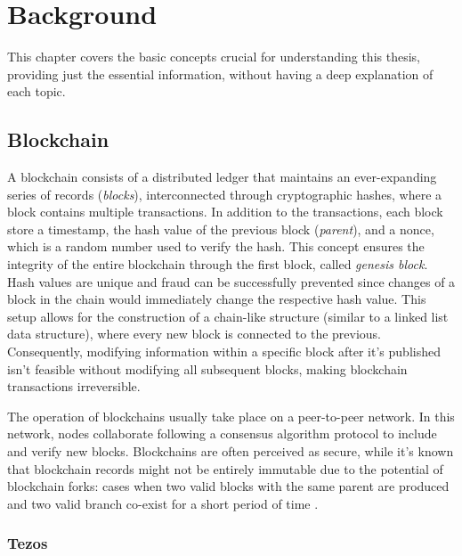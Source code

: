 \chapter{Background}

This chapter covers the basic concepts crucial for understanding this thesis, providing just the essential information, without having a deep explanation of each topic.

\section{Blockchain}

A blockchain consists of a distributed ledger that maintains an ever-expanding series of records (\textit{blocks}), interconnected through cryptographic hashes, where a block contains multiple transactions. In addition to the transactions, each block store a timestamp, the hash value of the previous block (\textit{parent}), and a nonce, which is a random number used to verify the hash. This concept ensures the integrity of the entire blockchain through the first block, called \textit{genesis block}. Hash values are unique and fraud can be successfully prevented since changes of a block in the chain would immediately change the respective hash value. This setup allows for the construction of a chain-like structure (similar to a linked list data structure), where every new block is connected to the previous. Consequently, modifying information within a specific block after it's published isn't feasible without modifying all subsequent blocks, making blockchain transactions irreversible. \cite{nofer_blockchain_2017}

The operation of blockchains usually take place on a peer-to-peer network. In this network, nodes collaborate following a consensus algorithm protocol to include and verify new blocks. Blockchains are often perceived as secure, while it's known that blockchain records might not be entirely immutable due to the potential of blockchain forks: cases when two valid blocks with the same parent are produced and two valid branch co-exist for a short period of time \cite{goldberg_short_2019}.

\subsection{Tezos}

